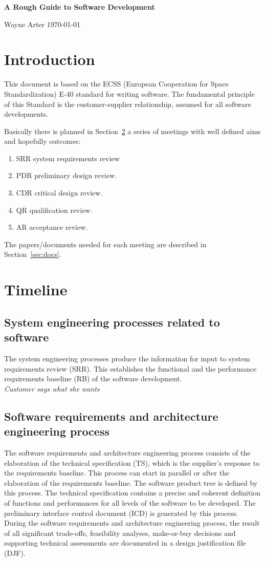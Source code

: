 \documentclass[12pt]{article}
\newcommand{\Sec}[1]{Section~\ref{sec:#1}}
\begin{document}
\centerline{\bf\LARGE A Rough  Guide to Software Development}
\vfill
\centerline{\Large Wayne Arter \today}
\vfill
\section{Introduction}

This document is based on the ECSS 
(European Cooperation for Space Standardization) E-40 standard for
writing software.
The fundamental principle of this Standard is the customer-supplier relationship, assumed for all software developments.

Basically there is planned in \Sec{timel} a series of meetings with well defined
aims and hopefully outcomes:
\begin{enumerate}
\item SRR system requirements review
\item PDR preliminary design review.
\item CDR critical design review.
\item QR qualification review.
\item AR acceptance review.
\end{enumerate}

The papers/documents needed for each meeting  are described in \Sec{docs}.

\section{Timeline}\label{sec:timel}

\subsection{System engineering processes related to software}

The system engineering
processes produce the information for input to system requirements review (SRR).
This establishes the functional and the performance requirements baseline (RB)
of the software development. \\
\emph{Customer says what she wants}


\subsection{Software requirements and architecture engineering process}
The software
requirements and architecture engineering process consists of the elaboration of
the technical specification (TS), which is the supplier's response to the requirements baseline.
This process can start in parallel or after the elaboration of the requirements baseline.
The software product tree is defined by this process.
The technical specification contains a precise and coherent
definition of functions and performances for all levels of the software to be developed.
The preliminary interface control document (ICD) is generated by this process.
During the software requirements and architecture engineering process, the result of all significant trade-offs, feasibility analyses, make-or-buy decisions
and supporting technical assessments are documented in a design justification file (DJF).
\end{document}
